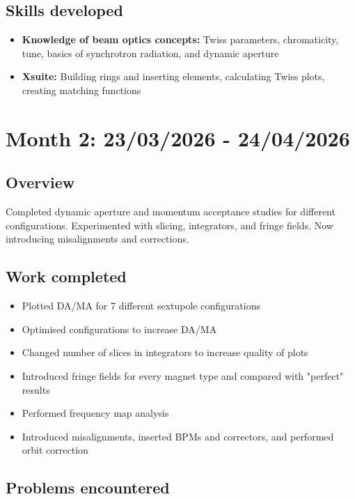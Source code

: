 \documentclass{article}
\begin{document}
\subsection{Skills developed}
\begin{itemize}
    \item \textbf{Knowledge of beam optics concepts:} Twiss parameters, chromaticity, tune, basics of synchrotron radiation, and dynamic aperture
    \item \textbf{Xsuite:} Building rings and inserting elements, calculating Twiss plots, creating matching functions
\end{itemize}


\section{Month 2: 23/03/2026 - 24/04/2026}
\subsection{Overview}

Completed dynamic aperture and momentum acceptance studies for different configurations. Experimented with slicing, integrators, and fringe fields. Now introducing misalignments and corrections.

\subsection{Work completed}

\begin{itemize}
\item Plotted DA/MA for 7 different sextupole configurations 
\item Optimised configurations to increase DA/MA
\item Changed number of slices in integrators to increase quality of plots
\item Introduced fringe fields for every magnet type and compared with "perfect" results
\item Performed frequency map analysis
\item Introduced misalignments, inserted BPMs and correctors, and performed orbit correction
\end{itemize}

\subsection{Problems encountered}
\end{document}
